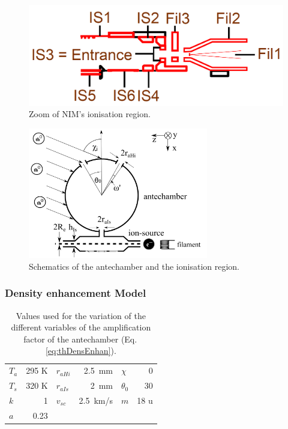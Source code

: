 		\begin{figure}[h]
			\centering
			\includegraphics[width= .5\textwidth]{Bilder/NIM_schema_zoom_IS.png}
			\caption{Zoom of NIM's ionisation region.}
			\label{fig:ISZoom}
		\end{figure}
		\begin{figure}[h]
			\centering
			\includegraphics[width= 0.7\textwidth]{Bilder/particleDensEnh.png}
			\caption{Schematics of the antechamber and the ionisation region.}
			\label{fig:thAntIs}
		\end{figure}

		\subsubsection{Density enhancement Model }\label{subsubsec:Densenhan}
		\begin{table}
			\begin{center}
				\begin{tabular}{|l r |l r |l r|}
					\hline
					$T_a$ 	& 295 K	& $r_{aHi}$	& 2.5\, mm	& $\chi$	& 0\degree \\
					$T_s$ 	& 320 K & $r_{aIs}$ & 2\, mm	& $\theta_0$& 30\degree\\	
					$k$		&	1	& $v_{sc}$	& 2.5\, km/s& $m$		& 18 u\\
					$a$		& 0.23	&			&			&			&	\\
					\hline
				\end{tabular}
			\end{center}
			\caption{Values used for the variation of the different variables of the amplification factor of the antechamber (Eq.\,\eqref{eq:thDensEnhan}).}
			\label{tab:thDensEnhan}
		\end{table}
		
